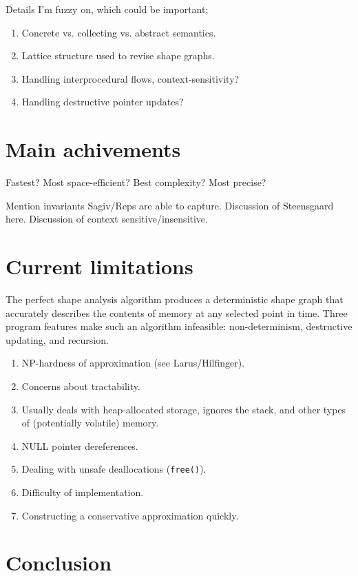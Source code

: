\documentclass{article}
\begin{document}
Details I'm fuzzy on, which could be important;
\begin{enumerate}[1.]
    \item Concrete vs. collecting vs. abstract semantics.
    \item Lattice structure used to revise shape graphs.
    \item Handling interprocedural flows, context-sensitivity?
    \item Handling destructive pointer updates?
\end{enumerate}

\section{Main achivements}

Fastest?
Most space-efficient?
Best complexity?
Most precise?

Mention invariants Sagiv/Reps are able to capture.
Discussion of Steensgaard here.
Discussion of context sensitive/insensitive.

\section{Current limitations}

The perfect shape analysis algorithm produces a deterministic shape graph
that accurately describes the contents of memory at any selected point in
time. Three program features make such an algorithm infeasible:
non-determinism, destructive updating, and recursion. 

\begin{enumerate}[1.]
    \item NP-hardness of approximation (see Larus/Hilfinger).
    \item Concerns about tractability.
    \item Usually deals with heap-allocated storage, ignores the stack, and
        other types of (potentially volatile) memory.
    \item NULL pointer dereferences.
    \item Dealing with unsafe deallocations (\texttt{free()}).
    \item Difficulty of implementation.
    \item Constructing a conservative approximation quickly.
\end{enumerate}

\section{Conclusion}
\end{document}
